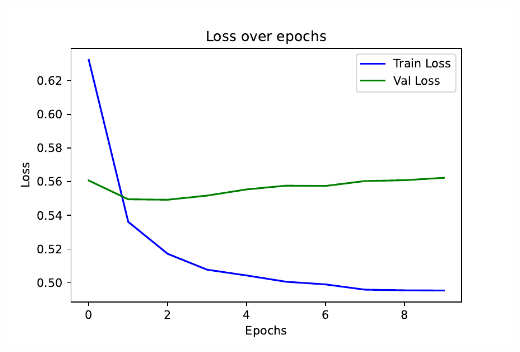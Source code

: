\documentclass[12pt]{article}
\begin{document}
\\ \includegraphics[width=16cm, height=12cm]{tfidf_loss}\\ 
\end{document}
